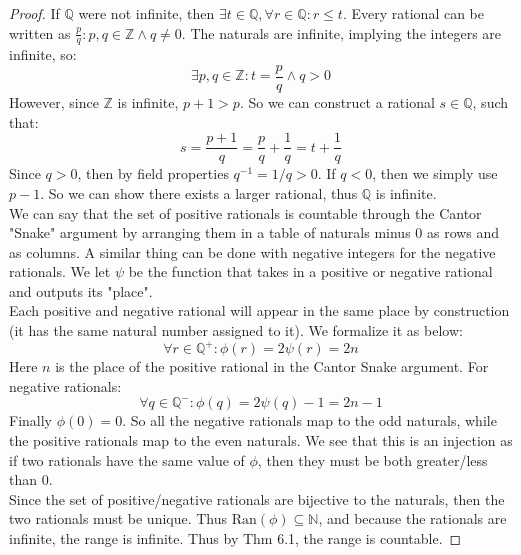 \documentclass{article}
\begin{document}
\begin{proof}
If $\mathbb{Q}$ were not infinite, then $\exists t \in \mathbb{Q}, \forall r \in \mathbb{Q}: r \leqslant t$. Every rational can be written as $\frac{p}{q}: p, q \in \mathbb{Z} \land q \neq 0$. The naturals are infinite, implying the integers are infinite, so:
\begin{equation*}
    \exists p, q \in \mathbb{Z}: t = \frac{p}{q} \land q > 0
\end{equation*}
However, since $\mathbb{Z}$ is infinite, $p+1 > p$. So we can construct a rational $s \in \mathbb{Q}$, such that:
\begin{equation*}
    s = \frac{p+1}{q} = \frac{p}{q} + \frac{1}{q} = t + \frac{1}{q}
\end{equation*}
Since $q> 0$, then by field properties $q^{-1} = 1/q > 0$. If $q < 0$, then we simply use $p-1$. So we can show there exists a larger rational, thus $\mathbb{Q}$ is infinite.\\

We can say that the set of positive rationals is countable through the Cantor "Snake" argument by arranging them in a table of naturals minus 0 as rows and as columns. A similar thing can be done with negative integers for the negative rationals. We let $\psi$ be the function that takes in a positive or negative rational and outputs its "place".\\

Each positive and negative rational will appear in the same place by construction (it has the same natural number assigned to it). We formalize it as below:
\begin{equation*}
    \forall r \in \mathbb{Q}^+: \phi(r) = 2\psi(r) = 2n
\end{equation*}
Here $n$ is the place of the positive rational in the Cantor Snake argument. For negative rationals:
\begin{equation*}
    \forall q \in \mathbb{Q}^-: \phi(q) = 2\psi(q) - 1 = 2n-1
\end{equation*}
Finally $\phi(0) = 0$. So all the negative rationals map to the odd naturals, while the positive rationals map to the even naturals. We see that this is an injection as if two rationals have the same value of $\phi$, then they must be both greater/less than 0.\\

Since the set of positive/negative rationals are bijective to the naturals, then the two rationals must be unique. Thus $\text{Ran}(\phi) \subseteq \mathbb{N}$, and because the rationals are infinite, the range is infinite. Thus by Thm 6.1, the range is countable.
\end{proof}
\end{document}

